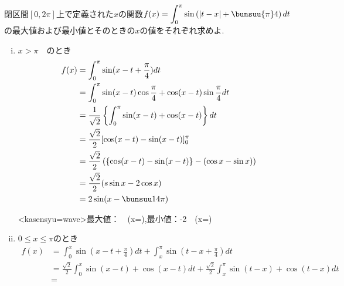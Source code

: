 \begin{problem}
閉区間$[0,2\pi]$上で定義された$x$の関数$f(x)=\displaystyle\int^\pi_0 \sin \left(|t-x| + \bunsuu{\pi}4\right) dt$　の最大値および最小値とそのときの$x$の値をそれぞれ求めよ.
\end{problem}
\kaie
\begin{enumerate}[(i)\ ]
  \item $x>\pi$　のとき
    \begin{align*}
      f(x) &= \int^\pi_0 \sin(x-t+\frac{\pi}4)dt\\
      &= \int^\pi_0 \sin(x-t)\cos\frac\pi 4 + \cos(x-t)\sin\frac\pi 4 dt\\
      &=\frac1{\sqrt{2}} \left\{\int^{\pi}_0 \sin(x-t) + \cos(x-t) \right\} dt\\
      &= \frac{\sqrt{2}}2 [\cos(x-t) - \sin(x-t)]^\pi_0\\
      &= \frac{\sqrt{2}}2 \left(\left\{\cos(x-t) - \sin(x-t)\right\} - \left(\cos x - \sin x\right)\right)\\
      &= \frac{\sqrt{2}}2 (s\sin x - 2 \cos x)\\
      &= 2 \sin(x-\bunsuu14 \pi)
    \end{align*}
    \begin{center}
      \emkasen<kasensyu=wave>{最大値：　(x=),最小値：-2　(x=)}
    \end{center}
  \item $0 \leq x \leq \pi$のとき
    \begin{align*}
      f(x) &= \int^x_0 \sin(x-t+\frac\pi 4)dt + \int^\pi_x \sin(t-x+\frac\pi 4)dt\\
      &= \frac{\sqrt{2}}2 \int^x_0 \sin(x-t)+\cos(x-t)dt + \frac{\sqrt{2}}2 \int^\pi_x \sin(t-x)+\cos(t-x)dt\\
      &=
    \end{align*}
\end{enumerate}
